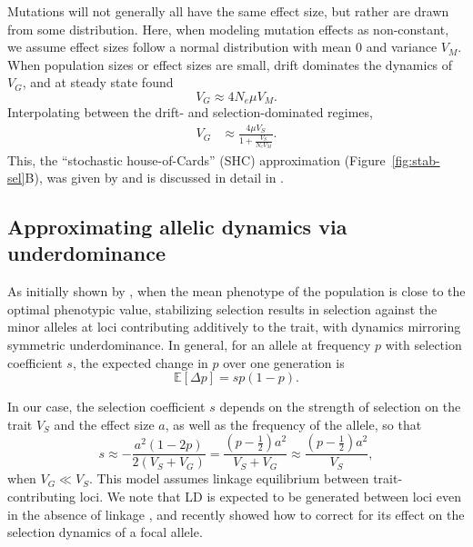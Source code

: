 \documentclass{article}
\newcommand{\E}{\mathbb{E}}
\begin{document}
Mutations will not generally all have the same effect size, but rather are
drawn from some distribution. Here, when modeling mutation effects as
non-constant, we assume effect sizes follow a normal distribution with mean 0
and variance $V_M$. When population sizes or effect sizes are small, drift
dominates the dynamics of $V_G$, and at steady state \citet{lande1976natural}
found \[V_G \approx 4 N_e \mu V_M.\] Interpolating between the drift- and
selection-dominated regimes,
\begin{align}\label{eq:SHC}
    V_G & \approx \frac{4 \mu V_S}{1 + \frac{V_S}{N_e V_M}}.
\end{align}
This, the ``stochastic
house-of-Cards'' (SHC) approximation (Figure~\ref{fig:stab-sel}B), was given by
\citet{burger1989much} and is discussed in detail in \citet[][Ch.
28]{walsh2018evolution}.

\subsection*{Approximating allelic dynamics via underdominance}

As initially shown by \citet{robertson1956effect} \citep[see
also,][]{keightley1988quantitative, simons2018population}, when the mean
phenotype of the population is close to the optimal phenotypic value,
stabilizing selection results in selection against the minor alleles at loci
contributing additively to the trait, with dynamics mirroring symmetric
underdominance. In general, for an allele at frequency $p$ with selection
coefficient $s$, the expected change in $p$ over one generation is
\begin{equation}
    \E[\Delta p] = sp(1-p).
\end{equation}

In our case, the selection coefficient $s$ depends on the strength of selection
on the trait $V_S$ and the effect size $a$, as well as the frequency of the
allele, so that
\begin{equation}\label{eq:selcoeff}
    s\approx -\frac{a^2(1-2p)}{2(V_S+V_G)} 
    = \frac{\left(p-\frac{1}{2}\right)a^2}{V_S + V_G}
    \approx \frac{\left(p-\frac{1}{2}\right)a^2}{V_S},
\end{equation}
when $V_G \ll V_S$. This model assumes linkage equilibrium between
trait-contributing loci. We note that LD is expected to be generated between
loci even in the absence of linkage \citep{bulmer1971effect}, and
\citet{negm2024effect} recently showed how to correct for its effect on the
selection dynamics of a focal allele.
\end{document}
